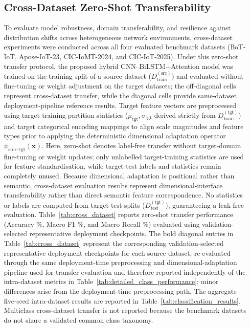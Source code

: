 \documentclass[a4paper,fleqn]{cas-sc}
\begin{document}
\subsection{Cross-Dataset Zero-Shot Transferability}
To evaluate model robustness, domain transferability, and resilience against distribution shifts across heterogeneous network environments, cross-dataset experiments were conducted across all four evaluated benchmark datasets (BoT-IoT, Apose-IoT-23, CIC-IoMT-2024, and CIC-IoT-2025). Under this zero-shot transfer protocol, the proposed hybrid CNN--BiLSTM+Attention model was trained on the training split of a source dataset ($D_{\text{train}}^{(\text{src})}$) and evaluated without fine-tuning or weight adjustment on the target datasets; the off-diagonal cells represent cross-dataset transfer, while the diagonal cells provide same-dataset deployment-pipeline reference results. Target feature vectors are preprocessed using target training partition statistics ($\mu_{\text{tgt}}, \sigma_{\text{tgt}}$ derived strictly from $D_{\text{train}}^{(\text{tgt})}$) and target categorical encoding mappings to align scale magnitudes and feature types prior to applying the deterministic dimensional adaptation operator $\psi_{\text{src} \leftarrow \text{tgt}}(\mathbf{x})$. Here, zero-shot denotes label-free transfer without target-domain fine-tuning or weight updates; only unlabelled target-training statistics are used for feature standardisation, while target-test labels and statistics remain completely unused. Because dimensional adaptation is positional rather than semantic, cross-dataset evaluation results represent dimensional-interface transferability rather than direct semantic feature correspondence. No statistics or labels are computed from target test splits ($D_{\text{test}}^{(\text{tgt})}$), guaranteeing a leak-free evaluation. Table~\ref{tab:cross_dataset} reports zero-shot transfer performance (Accuracy \%, Macro F1 \%, and Macro Recall \%) evaluated using validation-selected representative deployment checkpoints. The bold diagonal entries in Table~\ref{tab:cross_dataset} represent the corresponding validation-selected representative deployment checkpoints for each source dataset, re-evaluated through the same deployment-time preprocessing and dimensional-adaptation pipeline used for transfer evaluation and therefore reported independently of the intra-dataset metrics in Table~\ref{tab:detailed_class_performance}; minor differences arise from the deployment-time preprocessing path. The aggregate five-seed intra-dataset results are reported in Table~\ref{tab:classification_results}. Multiclass cross-dataset transfer is not reported because the benchmark datasets do not share a validated common class taxonomy.
\end{document}
